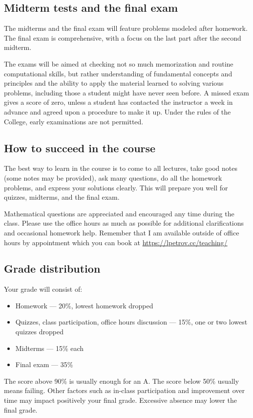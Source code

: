 \documentclass[oneside,11pt]{amsart}
\begin{document}
\subsection{Midterm tests and the final exam}

The midterms and the final exam will feature
problems modeled after homework.
The final exam is comprehensive, with a focus on the last part
after the second midterm.

The exams will be aimed at checking not so much memorization and
routine computational skills, but rather understanding of fundamental
concepts and principles and the ability to apply the material
learned to solving various problems, including those a student might
have never seen before. A missed exam gives a score of zero, unless a
student has contacted the instructor a week in advance and agreed upon a
procedure to make it up. Under the rules of
the College, early examinations are not permitted.

\subsection{How to succeed in the course}

The best way to learn in the course is to come to all lectures, take good notes
(some notes may be provided),
ask many questions,
do all the homework problems, and express your solutions
clearly.
This will prepare you well for quizzes, midterms, and the final exam.

Mathematical questions are appreciated and encouraged any time during the
class. Please use the office hours as much as possible for additional
clarifications and occasional homework help. Remember that I am available outside 
of office hours by appointment which you can book at
\url{https://lpetrov.cc/teaching/}

\subsection{Grade distribution}

Your grade will consist of:
\begin{itemize}
	\item Homework --- 20\%, lowest homework dropped
	\item Quizzes, class participation, office hours discussion --- 15\%, one or two lowest quizzes dropped
	\item Midterms --- 15\% each
	\item Final exam --- 35\%
\end{itemize}
The score above 90\% is usually enough for an A.
The score below 50\% usually means failing.
Other factors such as in-class participation
and improvement over time may impact positively your final grade.
Excessive absence may lower the final grade.
\end{document}
